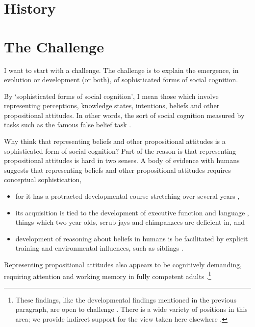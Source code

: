 \documentclass[12pt,a4paper]{extarticle}
\begin{document}
\setlength\footnotesep{1em}


\maketitle


\section{History}



\section{The Challenge}
I want to start with a challenge.  
The challenge is to explain the emergence, in evolution or development (or both), of sophisticated forms of social cognition.

By `sophisticated forms of social cognition', I mean those which involve representing perceptions, knowledge states, intentions, beliefs and other propositional attitudes.
In other words, the sort of social cognition measured by tasks such as the famous false belief task \citep{Wimmer:1983dz}.

Why think that representing beliefs and other propositional attitudes is a sophisticated form of social cognition?
Part of the reason is that representing propositional attitudes is hard in two senses.  
A body of evidence with humans suggests that representing  beliefs and other propositional attitudes requires conceptual sophistication, 
%
\begin{itemize}
\item for it has a protracted developmental course stretching over several years \citep{Wimmer:1983dz,Wellman:2001lz}, 
\item its acquisition is tied to the development of executive function \citep{Perner:1999yr,Sabbagh:2006ke} and language \citep{Astington2005ot}, things which two-year-olds, scrub jays and chimpanzees are deficient in, and   
\item development of reasoning about beliefs in humans is be facilitated by explicit training \citep{Slaughter:1996fv} and environmental influences, such as siblings \citep{Clements:2000nc,Hughes:2004zj}.  
\end{itemize}
%
Representing propositional attitudes also appears to be cognitively demanding, requiring attention and working memory in fully competent adults \citep{Apperly:2008jv,Apperly:2009cc,McKinnon:2007rr}.\footnote{
These findings, like the developmental findings mentioned in the previous paragraph, are open to challenge \citep[e.g.][]{Leslie:2005ef}.  
There is a wide variety of positions in this area; we provide indirect support for the view taken here elsewhere \citep{Apperly:2009ju,butterfill_minimal}.
}
\end{document}
